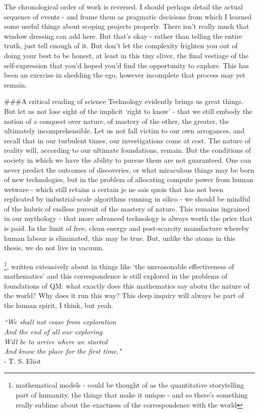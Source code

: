 The chronological order of work is reversed.
	I should perhaps detail the
actual sequence of events - and frame them as pragmatic decisions from
which I learned some useful things about scoping projects properly.
There isn't really much that window dressing can add here.
	But that's
okay - rather than telling the entire truth, just tell enough of it.
	But
don't let the complexity frighten you out of doing your best to be
honest, at least in this tiny sliver, the final vestiage of the
self-expression that you'd hoped you'd find the opportunity to explore.
This has been an exercise in shedding the ego, however incomplete that
process may yet remain.

\#\#\#A critical reading of science Technology evidently brings us great
things.
	But let us not lose sight of the implicit `right to know' - that
we still embody the notion of a conquest over nature, of mastery of the
other, the greater, the ultimately incomprehensible.
	Let us not fall
victim to our own arrogances, and recall that in our turbulent times,
our investigations come at cost.
	The nature of reality will, according
to our ultimate foundations, remain.
	But the conditions of society in
which we have the ability to pursue them are not guaranteed.
	One can
never predict the outcomes of discoveries, or what miraculous things may
be born of new technologies, but in the problem of allocating compute
power from human wetware - which still retains a certain je ne sais
quois that has not been replicated by industrial-scale algorithms
running in silico - we should be mindful of the hubris of endless
pursuit of the mastery of nature.
	This remains ingrained in our
mythology - that more advanced technology is always worth the price that
is paid.
	In the limit of free, clean energy and post-scarcity
manufacture whereby human labour is eliminated, this may be true.
	But,
unlike the atoms in this thesis, we do not live in vacuum.


\footnote{mathematical models - could be thought of as the quantitative storytelling part of humanity, the things that make it unique - and so there's something really sublime about the exactness of the correspondence with the world}, written extensively about in things like `the unreasonable effectiveness of mathematics' and this correspondence is still explored in the problems of foundations of QM: what exactly does this mathematics say abotu the nature of the world? Why does it run this way? This deep inquiry will always be part of the human spirit, I think, but yeah.
	

\vfill
\begin{flushright}
\emph{``We shall not cease from exploration\\
And the end of all our exploring \\
Will be to arrive where we started \\
And know the place for the first time."\\} 
- T.
	S.
	Eliot
\end{flushright}
